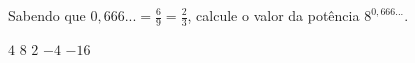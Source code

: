 Sabendo que $0{,}666...=\frac{6}{9}=\frac{2}{3}$, calcule o valor da potência $8^{0{,}666...}$.

$4$
$8$
$2$
$-4$
$-16$


